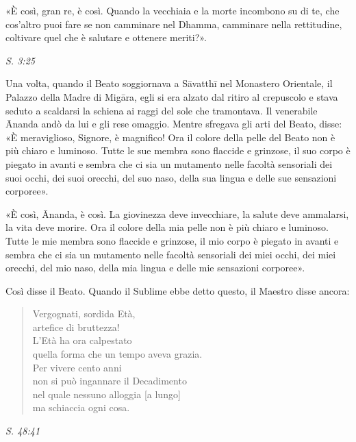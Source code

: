 «È così, gran re, è così. Quando la vecchiaia e la morte incombono su di
te, che cos’altro puoi fare se non camminare nel Dhamma, camminare nella
rettitudine, coltivare quel che è salutare e ottenere meriti?».


\emph{S. 3:25}


Una volta, quando il Beato soggiornava a Sāvatthī nel Monastero
Orientale, il Palazzo della Madre di Migāra, egli si era alzato dal
ritiro al crepuscolo e stava seduto a scaldarsi la schiena ai raggi del
sole che tramontava. Il venerabile Ānanda andò da lui e gli rese
omaggio. Mentre sfregava gli arti del Beato, disse: «È meraviglioso,
Signore, è magnifico! Ora il colore della pelle del Beato non è più
chiaro e luminoso. Tutte le sue membra sono flaccide e grinzose, il suo
corpo è piegato in avanti e sembra che ci sia un mutamento nelle facoltà
sensoriali dei suoi occhi, dei suoi orecchi, del suo naso, della sua
lingua e delle sue sensazioni corporee».


«È così, Ānanda, è così. La giovinezza deve invecchiare, la salute deve
ammalarsi, la vita deve morire. Ora il colore della mia pelle non è più
chiaro e luminoso. Tutte le mie membra sono flaccide e grinzose, il mio
corpo è piegato in avanti e sembra che ci sia un mutamento nelle facoltà
sensoriali dei miei occhi, dei miei orecchi, del mio naso, della mia
lingua e delle mie sensazioni corporee».


Così disse il Beato. Quando il Sublime ebbe detto questo, il Maestro
disse ancora:


\begin{quotation}
Vergognati, sordida Età, \\
artefice di bruttezza! \\
L’Età ha ora calpestato \\
quella forma che un tempo aveva grazia. \\
Per vivere cento anni \\
non si può ingannare il Decadimento \\
nel quale nessuno alloggia [a lungo] \\
ma schiaccia ogni cosa.
\end{quotation}

\emph{S. 48:41}


